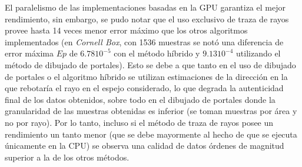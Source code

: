 El paralelismo de las implementaciones basadas en la GPU garantiza el mejor rendimiento, sin embargo, se pudo notar que el uso exclusivo de traza de rayos provee hasta 14 veces menor error máximo que los otros algoritmos implementados (en \textit{Cornell Box}, con 1536 muestras se notó una diferencia de error máxima $Ep$ de $6.78 10^{-5}$ con el método híbrido y  $9.13 10^{-4}$ utilizando el método de dibujado de portales). Esto se debe a que tanto en el uso de dibujado de portales o el algoritmo híbrido se utilizan estimaciones de la dirección en la que rebotaría el rayo en el espejo considerado, lo que degrada la autenticidad final de los datos obtenidos, sobre todo en el dibujado de portales donde la granularidad de las muestras obtenidas es inferior (se toman muestras por área y no por rayo). Por lo tanto, incluso si el método de traza de rayos posee un rendimiento un tanto menor (que se debe mayormente al hecho de que se ejecuta únicamente en la CPU) se observa una calidad de datos órdenes de magnitud superior a la de los otros métodos.

